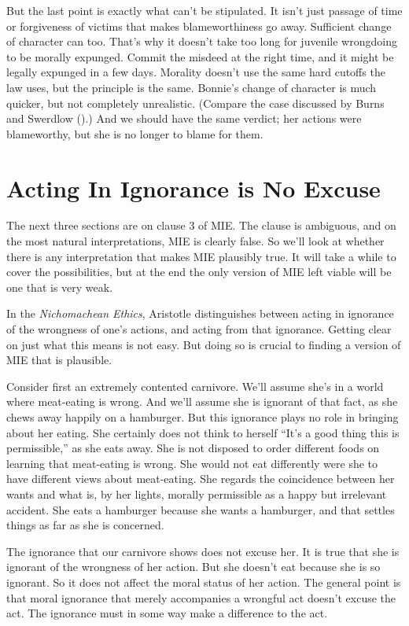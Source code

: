 \documentclass[
  10pt,
  letterpaper,
  twoside]{scrbook}
\begin{document}
But the last point is exactly what can't be stipulated. It isn't just
passage of time or forgiveness of victims that makes blameworthiness go
away. Sufficient change of character can too. That's why it doesn't take
too long for juvenile wrongdoing to be morally expunged. Commit the
misdeed at the right time, and it might be legally expunged in a few
days. Morality doesn't use the same hard cutoffs the law uses, but the
principle is the same. {Bonnie}'s change of character is much quicker,
but not completely unrealistic. (Compare the case discussed by Burns and
Swerdlow ().) And we should have
the same verdict; her actions were blameworthy, but she is no longer to
blame for them.

\section{Acting In Ignorance is No
Excuse}\label{actinginignoranceisnoexcuse}

The next three sections are on clause 3 of MIE. The clause is ambiguous,
and on the most natural interpretations, MIE is clearly false. So we'll
look at whether there is any interpretation that makes MIE plausibly
true. It will take a while to cover the possibilities, but at the end
the only version of MIE left viable will be one that is very weak.

In the \emph{Nichomachean Ethics}, Aristotle distinguishes between
acting in ignorance of the wrongness of one's actions, and acting from
that ignorance. Getting clear on just what this means is not easy. But
doing so is crucial to finding a version of MIE that is plausible.

Consider first an extremely contented carnivore. We'll assume she's in a
world where meat-eating is wrong. And we'll assume she is ignorant of
that fact, as she chews away happily on a hamburger. But this ignorance
plays no role in bringing about her eating. She certainly does not think
to herself ``It's a good thing this is permissible,'' as she eats away.
She is not disposed to order different foods on learning that
meat-eating is wrong. She would not eat differently were she to have
different views about meat-eating. She regards the coincidence between
her wants and what is, by her lights, morally permissible as a happy but
irrelevant accident. She eats a hamburger because she wants a hamburger,
and that settles things as far as she is concerned.

The ignorance that our carnivore shows does not excuse her. It is true
that she is ignorant of the wrongness of her action. But she doesn't eat
because she is so ignorant. So it does not affect the moral status of
her action. The general point is that moral ignorance that merely
accompanies a wrongful act doesn't excuse the act. The ignorance must in
some way make a difference to the act.
\end{document}
